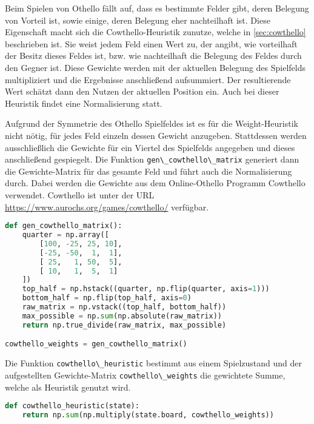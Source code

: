 Beim Spielen von Othello fällt auf, dass es bestimmte Felder gibt, deren
Belegung von Vorteil ist, sowie einige, deren Belegung eher nachteilhaft
ist. Diese Eigenschaft macht sich die Cowthello-Heuristik
\cite{cowthello} zunutze, welche in \ref{sec:cowthello} beschrieben ist.
Sie weist jedem Feld einen Wert zu, der angibt, wie vorteilhaft der
Besitz dieses Feldes ist, bzw. wie nachteilhaft die Belegung des Feldes
durch den Gegner ist. Diese Gewichte werden mit der aktuellen Belegung
des Spielfelds multipliziert und die Ergebnisse anschließend
aufsummiert. Der resultierende Wert schätzt dann den Nutzen der
aktuellen Position ein. Auch bei dieser Heuristik findet eine
Normalisierung statt.

Aufgrund der Symmetrie des Othello Spielfeldes ist es für die
Weight-Heuristik nicht nötig, für jedes Feld einzeln dessen Gewicht
anzugeben. Stattdessen werden ausschließlich die Gewichte für ein
Viertel des Spielfelds angegeben und dieses anschließend gespiegelt. Die
Funktion \passthrough{\lstinline!gen\_cowthello\_matrix!} generiert dann
die Gewichte-Matrix für das gesamte Feld und führt auch die
Normalisierung durch. Dabei werden die Gewichte aus dem Online-Othello
Programm Cowthello \cite{cowthello} verwendet. Cowthello ist unter der
URL \url{https://www.aurochs.org/games/cowthello/} verfügbar.

\begin{lstlisting}[language=Python]
def gen_cowthello_matrix():
    quarter = np.array([
        [100, -25, 25, 10],
        [-25, -50,  1,  1],
        [ 25,   1, 50,  5],
        [ 10,   1,  5,  1]
    ])
    top_half = np.hstack((quarter, np.flip(quarter, axis=1)))
    bottom_half = np.flip(top_half, axis=0)
    raw_matrix = np.vstack((top_half, bottom_half))
    max_possible = np.sum(np.absolute(raw_matrix))
    return np.true_divide(raw_matrix, max_possible)

cowthello_weights = gen_cowthello_matrix()
\end{lstlisting}

Die Funktion \passthrough{\lstinline!cowthello\_heuristic!} bestimmt aus
einem Spielzustand und der aufgestellten Gewichte-Matrix
\passthrough{\lstinline!cowthello\_weights!} die gewichtete Summe,
welche als Heuristik genutzt wird.

\begin{lstlisting}[language=Python]
def cowthello_heuristic(state):
    return np.sum(np.multiply(state.board, cowthello_weights))
\end{lstlisting}

